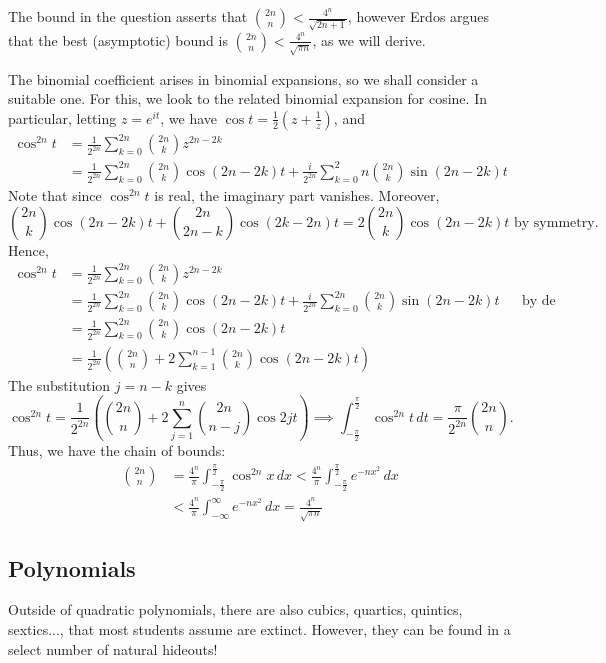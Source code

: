 \documentclass[../main.tex]{subfiles}
\begin{document}
    The bound in the question asserts that $\binom{2n}{n} < \frac{4^n}{\sqrt{2n+1}}$, however Erdos argues that the best (asymptotic) bound is $\binom{2n}{n} < \frac{4^n}{\sqrt{\pi n}}$, as we will derive.
    
    The binomial coefficient arises in binomial expansions, so we shall consider a suitable one. For this, we look to the related binomial expansion for cosine. In particular, letting $z=e^{it}$, we have $\cos{t} = \frac{1}{2}\left(z+\frac{1}{z}\right)$, and \begin{align*}
        \cos^{2n} t &= \frac{1}{2^{2n}}\sum_{k=0}^{2n} \binom{2n}{k}z^{2n-2k} \\
        &= \frac{1}{2^{2n}}\sum_{k=0}^{2n} \binom{2n}{k}\cos{(2n-2k)t}+\frac{i}{2^{2n}}\sum_{k=0}^2n \binom{2n}{k}\sin{(2n-2k)t}
    \end{align*}
    Note that since $\cos^{2n}{t}$ is real, the imaginary part vanishes. Moreover, $$\binom{2n}{k}\cos{(2n-2k)t}+\binom{2n}{2n-k}\cos{(2k-2n)t}=2\binom{2n}{k}\cos{(2n-2k)t}\text{ by symmetry}.$$
    Hence,
    \begin{align*}
        \cos^{2n} t &= \frac{1}{2^{2n}}\sum_{k=0}^{2n} \binom{2n}{k}z^{2n-2k} \\
        &= \frac{1}{2^{2n}}\sum_{k=0}^{2n} \binom{2n}{k}\cos{(2n-2k)t}+\frac{i}{2^{2n}}\sum_{k=0}^{2n} \binom{2n}{k}\sin{(2n-2k)t} && \text{by de Moivre's theorem}\\
        &= \frac{1}{2^{2n}}\sum_{k=0}^{2n} \binom{2n}{k}\cos{(2n-2k)t} \\
        &= \frac{1}{2^{2n}}\left(\binom{2n}{n}+2\sum_{k=1}^{n-1}\binom{2n}{k}\cos{(2n-2k)t}\right)
    \end{align*}
    The substitution $j=n-k$ gives
    $$
        \cos^{2n} t = \frac{1}{2^{2n}}\left(\binom{2n}{n}+2\sum_{j=1}^{n}\binom{2n}{n-j}\cos{2jt}\right)
    \implies
        \int_{-\frac{\pi}{2}}^{\frac{\pi}{2}}\cos^{2n} t \,dt = \frac{\pi}{2^{2n}}\binom{2n}{n}.
    $$
    Thus, we have the chain of bounds:
    \begin{align}
        \binom{2n}{n}&=\frac{4^n}{\pi}\int_{-\frac{\pi}{2}}^{\frac{\pi}{2}}\cos^{2n}{x} \,dx < \frac{4^n}{\pi}\int_{-\frac{\pi}{2}}^{\frac{\pi}{2}}e^{-nx^2} \,dx \label{5.1-tangent-ineq}\\
        &< \frac{4^n}{\pi}\int_{-\infty}^{\infty}e^{-nx^2} \,dx = \frac{4^n}{\sqrt{\pi n}} \label{5.1-tangent-eq}
    \end{align}

\subsection{Polynomials}
Outside of quadratic polynomials, there are also cubics, quartics, quintics, sextics..., that most students assume are extinct. However, they can be found in a select number of natural hideouts!
\end{document}
